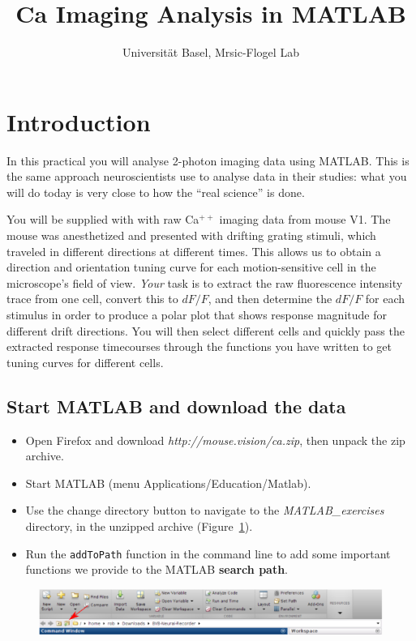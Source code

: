 \documentclass[paper=a4, fontsize=11pt]{article} %
\title{Ca\supr{++} Imaging Analysis in MATLAB}
\author{Universit\"{a}t Basel, Mrsic-Flogel Lab}
\date{}
\numberwithin{equation}{section} %
\numberwithin{figure}{section} %
\numberwithin{table}{section} %
\newcommand{\supr}[1]{\ensuremath{^{#1}}}
\begin{document}
\maketitle %


\section*{Introduction}

In this practical you will analyse 2-photon imaging data using MATLAB. This is the same approach
neuroscientists use to analyse data in their studies: what you will do today is very close to how the ``real science'' is done.

You will be supplied with with raw Ca\supr{++} imaging data from mouse V1. The mouse
was anesthetized and presented with drifting grating stimuli, which traveled in different directions at different times.
This allows us to obtain a direction and orientation tuning curve for each motion-sensitive cell in the microscope's field of view.
\emph{Your} task is to extract the raw fluorescence intensity trace from one cell, convert this to $dF/F$, and then
determine the $dF/F$ for each stimulus in order to produce a polar plot that shows response magnitude
for different drift directions. You will then  select different cells and quickly pass the extracted
response timecourses through the functions you have written to get tuning curves for different cells.


\subsection*{Start MATLAB and download the data}

\begin{itemize}
\setlength{\parskip}{0.25em}
\item Open Firefox and download \emph{http://mouse.vision/ca.zip}, then unpack the zip archive.
\item Start MATLAB (menu Applications/Education/Matlab).
\item Use the change directory button to navigate to the \emph{MATLAB\_exercises} directory, in the unzipped archive (Figure~\ref{fig:toolbar}).
\item Run the \texttt{addToPath} function in the command line to add some important functions we provide to the MATLAB
\textbf{search path}.
\end{itemize}

\begin{figure}[h]
    \centering
    \includegraphics[width=\textwidth]{change_dir.eps}
    \caption{}
    \label{fig:toolbar}
\end{figure}
\end{document}
